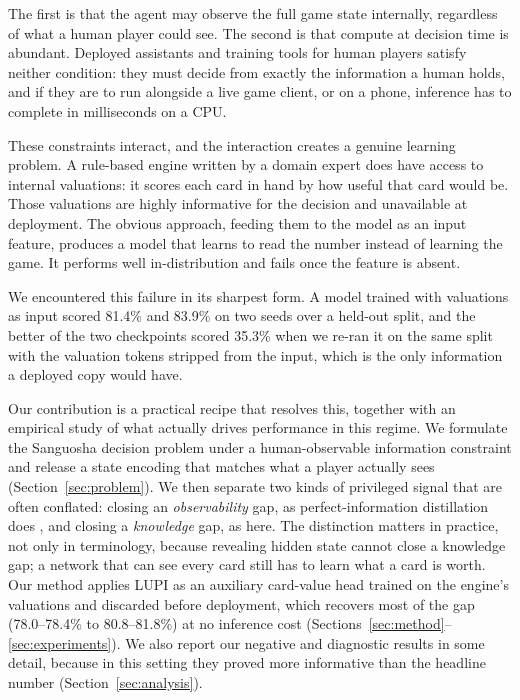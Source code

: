 \documentclass[11pt]{article}
\begin{document}
The first is that the agent may observe the full game state internally, regardless of what
a human player could see. The second is that compute at decision time is abundant. Deployed
assistants and training tools for human players satisfy neither condition: they must decide
from exactly the information a human holds, and if they are to run alongside a live game
client, or on a phone, inference has to complete in milliseconds on a CPU.

These constraints interact, and the interaction creates a genuine learning problem. A
rule-based engine written by a domain expert does have access to internal valuations: it
scores each card in hand by how useful that card would be. Those valuations are highly
informative for the decision and unavailable at deployment. The obvious approach, feeding
them to the model as an input feature, produces a model that learns to read the number
instead of learning the game. It performs well in-distribution and fails once the feature
is absent.

We encountered this failure in its sharpest form. A model trained with valuations as input
scored 81.4\% and 83.9\% on two seeds over a held-out split, and the better of the two
checkpoints scored 35.3\% when we re-ran it on the same split with the valuation tokens
stripped from the input, which is the only information a deployed copy would have.

Our contribution is a practical recipe that resolves this, together with an empirical study
of what actually drives performance in this regime. We formulate the Sanguosha decision
problem under a human-observable information constraint and release a state encoding that
matches what a player actually sees (Section~\ref{sec:problem}). We then separate two kinds
of privileged signal that are often conflated: closing an \emph{observability} gap, as
perfect-information distillation does \cite{yang2022perfectdou}, and closing a
\emph{knowledge} gap, as here. The distinction matters in practice, not only in
terminology, because revealing hidden state cannot close a knowledge gap; a network that
can see every card still has to learn what a card is worth. Our method applies LUPI
\cite{vapnik2009,vapnik2015} as an auxiliary card-value head trained on the engine's
valuations and discarded before deployment, which recovers most of the gap
(78.0--78.4\% to 80.8--81.8\%) at no inference cost
(Sections~\ref{sec:method}--\ref{sec:experiments}). We also report our negative and
diagnostic results in some detail, because in this setting they proved more informative
than the headline number (Section~\ref{sec:analysis}).
\end{document}
